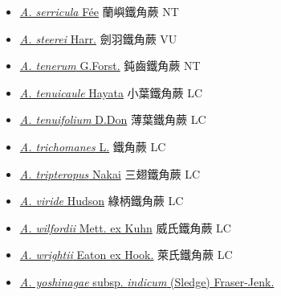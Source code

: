 \begin{itemize}
\begin{itemize}
        \item[] \href{http://www.theplantlist.org/tpl1.1/search?q=Asplenium+serricula}{\textit{A. serricula} Fée}   蘭嶼鐵角蕨   NT
        \item[] \href{http://www.theplantlist.org/tpl1.1/search?q=Asplenium+steerei}{\textit{A. steerei} Harr.}   劍羽鐵角蕨   VU
        \item[] \href{http://www.theplantlist.org/tpl1.1/search?q=Asplenium+tenerum}{\textit{A. tenerum} G.Forst.}   鈍齒鐵角蕨   NT
        \item[] \href{http://www.theplantlist.org/tpl1.1/search?q=Asplenium+tenuicaule}{\textit{A. tenuicaule} Hayata}   小葉鐵角蕨   LC
        \item[] \href{http://www.theplantlist.org/tpl1.1/search?q=Asplenium+tenuifolium}{\textit{A. tenuifolium} D.Don}   薄葉鐵角蕨   LC
        \item[] \href{http://www.theplantlist.org/tpl1.1/search?q=Asplenium+trichomanes}{\textit{A. trichomanes} L.}   鐵角蕨   LC
        \item[] \href{http://www.theplantlist.org/tpl1.1/search?q=Asplenium+tripteropus}{\textit{A. tripteropus} Nakai}   三翅鐵角蕨   LC
        \item[] \href{http://www.theplantlist.org/tpl1.1/search?q=Asplenium+viride}{\textit{A. viride} Hudson}   綠柄鐵角蕨   LC
        \item[] \href{http://www.theplantlist.org/tpl1.1/search?q=Asplenium+wilfordii}{\textit{A. wilfordii} Mett. ex Kuhn}   威氏鐵角蕨   LC
        \item[] \href{http://www.theplantlist.org/tpl1.1/search?q=Asplenium+wrightii}{\textit{A. wrightii} Eaton ex Hook.}   萊氏鐵角蕨   LC
        \item[] \href{http://www.theplantlist.org/tpl1.1/search?q=Asplenium+yoshinagae+subsp.+indicum}{\textit{A. yoshinagae}  subsp. \textit{indicum} (Sledge) Fraser-Jenk.}  

\end{itemize}
\end{itemize}
